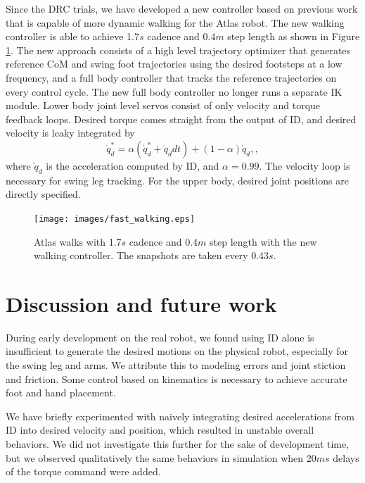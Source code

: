 \documentclass{ws-ijhr}
\newcommand{\fref}[1] {Figure \ref{#1}}
\begin{document}
Since the DRC trials, we have developed a new controller based on previous 
work \cite{sfeng_online,sfeng_proposal} that is capable of more dynamic walking for the Atlas
robot. The new walking controller is able to achieve 1.7$s$ cadence and 0.4$m$
step length as shown in \fref{fig:fast_walking}. 
The new approach consists of a high level trajectory optimizer that generates
reference CoM and swing foot trajectories using the desired footsteps at a low
frequency, and a full body controller that tracks the reference trajectories 
on every control cycle. 
The new full body controller no longer runs a separate IK module. 
Lower body joint level servos consist of only velocity and torque feedback 
loops. 
Desired torque comes straight from the output of ID, and desired velocity is 
leaky integrated by
\begin{equation}
  \dot{q}_d^* = \alpha (\dot{q}_d^* + \ddot{q}_d dt) + (1-\alpha) \dot{q}_d,
	\label{eq:qd_int},
\end{equation} 
where $\ddot{q}_d$ is the acceleration computed by ID, and $\alpha = 0.99$. 
The velocity loop is necessary for swing leg tracking. 
For the upper body, desired joint positions are directly specified.

\begin{figure} 
  \begin{center}
    {\texttt{[image: images/fast\_walking.eps]}}
    \caption{Atlas walks with 1.7$s$ cadence and 0.4$m$ step length with the
		new walking controller. The snapshots are taken every 0.43$s$.} 
		\label{fig:fast_walking}
  \end{center}
\end{figure}   


\section{Discussion and future work}
During early development on the real robot, we found using ID alone is 
insufficient to generate the desired motions on the physical robot, especially 
for the swing leg and arms. 
We attribute this to modeling errors and joint stiction and friction.
Some control based on kinematics is necessary to achieve accurate foot and hand 
placement. 

We have briefly experimented with naively integrating desired accelerations 
from ID into desired velocity and position, which resulted in unstable overall 
behaviors. We did not investigate this further for the sake of development time, but 
we observed qualitatively the same behaviors in simulation when 20$ms$ delays 
of the torque command were added.
\end{document}
